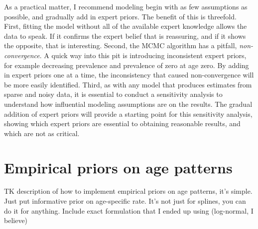 As a practical matter, I recommend modeling begin with as few
assumptions as possible, and gradually add in expert priors. The
benefit of this is threefold.  First, fitting the model without all of
the available expert knowledge allows the data to speak.  If it
confirms the expert belief that is reassuring, and if it shows the
opposite, that is interesting. Second, the MCMC algorithm has a
pitfall, \emph{non-convergence}. A quick way into this pit is
introducing inconsistent expert priors, for example decreasing
prevalence and prevalence of zero at age zero. By adding in expert
priors one at a time, the inconsistency that caused non-convergence
will be more easily identified. Third, as with any model that produces
estimates from sparse and noisy data, it is essential to conduct a
sensitivity analysis to understand how influential modeling
assumptions are on the results.  The gradual addition of expert priors
will provide a starting point for this sensitivity analysis, showing
which expert priors are essential to obtaining reasonable results, and
which are not as critical.

\section{Empirical priors on age patterns}
TK description of how to implement empirical priors on age patterns,
it's simple.  Just put informative prior on age-specific rate.
It's not just for splines, you can do it for anything.  Include
exact formulation that I ended up using (log-normal, I believe)
